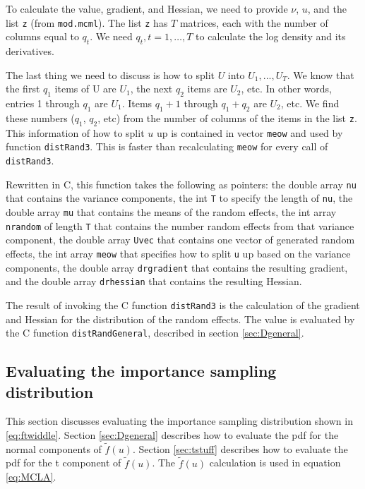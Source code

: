 \documentclass{article}
\begin{document}
To calculate the value, gradient, and Hessian, we need to provide  $\nu$, $u$, and the list \texttt{z} (from \texttt{mod.mcml}).  The list \texttt{z} has $T$ matrices, each with the number of columns equal to $q_t$. We need $q_t,t=1,\ldots,T$ to calculate the log density and its derivatives.



The last thing we need to discuss is how to split $U$ into $U_1,...,U_T$. We know that the first $q_1$ items of U are $U_1$, the next $q_2$ items are $U_2$, etc.  In other words, entries 1 through $q_1$ are $U_1$. Items $q_1+1$ through $q_1+q_2$ are $U_2$, etc. We find these numbers ($q_1$, $q_2$, etc) from the number of columns of the items in the list \texttt{z}. This information of how to split $u$ up is contained in vector \texttt{meow} and used by function \texttt{distRand3}. This is faster than recalculating \texttt{meow} for every call of \texttt{distRand3}. 

Rewritten in C, this function takes the following as pointers: the double array \texttt{nu} that contains the variance components, the int \texttt{T} to specify the length of \texttt{nu}, the double array \texttt{mu} that contains the means of the random effects, the int array \texttt{nrandom} of length \texttt{T} that contains the number random effects from that variance component, the double array \texttt{Uvec} that contains one vector of generated random effects,  the int array \texttt{meow} that specifies how to split \texttt{u} up based on the variance components, the double array \texttt{drgradient} that  contains the resulting gradient, and the double array \texttt{drhessian} that  contains the resulting Hessian.

The result of invoking the C function \texttt{distRand3} is  the calculation of the gradient and Hessian for the distribution of the random effects. The value is  evaluated by the C function \texttt{distRandGeneral}, described in section \ref{sec:Dgeneral}.



\subsection{Evaluating the importance sampling distribution}
This section discusses evaluating the importance sampling distribution shown in \ref{eq:ftwiddle}. Section \ref{sec:Dgeneral} describes how to evaluate the pdf for the normal components of $\tilde{f}(u)$. Section \ref{sec:tstuff} describes how to evaluate the pdf for the t component of $\tilde{f}(u)$. 
The  $\tilde{f}(u)$ calculation is used in equation \ref{eq:MCLA}. 
\end{document}
